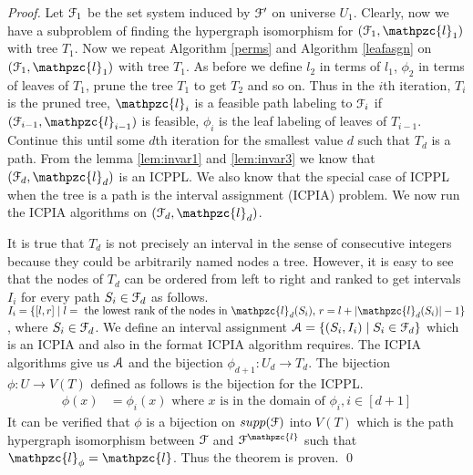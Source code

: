 \documentclass[a4paper,UKenglish,numberwithinsect]{lipics}
\def\cA{{\cal A}}
\def\cB{{\cal B}}
\def\cF{{\cal F}}
\def\cL{{\cal L}}
\def\cl{\mathpzc{l}}
\begin{document}
\begin{proof}
\noindent
Let $\cF_1$ be the set system induced by $\cF'$ on universe $U_1$.
Clearly, now we have a subproblem of finding the
hypergraph isomorphism for $(\cF_1, \cl_1)$ with tree $T_1$.
\noindent
Now we repeat Algorithm \ref{perms} and Algorithm \ref{leafasgn} on
$(\cF_1, \cl_1)$ with tree $T_1$. As before we define $l_2$ in terms
of $l_1$, $\phi_2$ in terms of leaves of $T_1$, prune the tree $T_1$
to get $T_2$ and so on.
Thus in the $i$th iteration, $T_i$ is the pruned tree, $\cl_i$ is a
feasible path labeling to $\cF_i$ if $(\cF_{i-1}, \cl_{i-1})$ is
feasible, $\phi_i$ is the leaf labeling of leaves of
$T_{i-1}$. Continue this until some $d$th iteration for the smallest
value $d$ such that $T_d$ is
a path. From
the lemma \ref{lem:invar1} and \ref{lem:invar3} we know that $(\cF_d, \cl_d)$  is an
ICPPL. We also know that the special case of ICPPL when the tree is a
path is the interval assignment (ICPIA) problem. 
We now
run the ICPIA algorithms \cite{nsnrs09} on $(\cF_d, \cl_d)$.

\noindent
It is true that $T_d$ is not  precisely an interval in the sense of consecutive integers
because they could be arbitrarily named nodes a tree. However, it is easy to see that
the nodes of $T_{d}$ can be ordered from left to right and ranked to get
intervals $I_i$ for every path $S_i \in \cF_d$ as follows. $I_i = \{[l,r]
\mid l = \text{ the lowest rank of the nodes in }\cl_d(S_i) \text{, } r = l+|\cl_d(S_i)|-1
\}$, where $S_i \in \cF_d$. We define an interval assignment $\cA = \{ (S_i, I_i) \mid S_i
\in \cF_d\}$ which is an ICPIA and also in the format ICPIA algorithm
requires. The ICPIA algorithms give us $\cA$ and the bijection $\phi_{d+1} : U_d \rightarrow T_d$. 
The bijection $\phi: U \rightarrow V(T)$ defined as follows is the bijection for the
ICPPL.
\begin{align*}
  \phi(x) &= \phi_i(x) \text{ where $x$ is in the domain of $\phi_i$},
  i \in [d+1]
\end{align*}
It can be verified that $\phi$ is a bijection on $supp(\cF)$ into
$V(T)$ which is the path hypergraph isomorphism between $\cF$ and
$\cF^\cl$ such that $\cl_\phi = \cl$. Thus the theorem is proven.
\qed
\end{proof}
\end{document}
